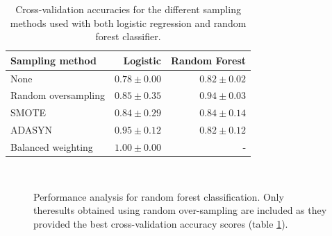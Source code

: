 \begin{table}[h]
    \centering
    \caption{Cross-validation accuracies for the different sampling methods
                used with both logistic regression and random forest
                classifier.}
    \label{tab:crossvals}
    \begin{tabular}{l|r|r}
        Sampling method & Logistic & Random Forest \\
        \hline
        None & $0.78 \pm 0.00$ & $0.82 \pm 0.02$ \\
        Random oversampling & $0.85 \pm 0.35$ & $0.94 \pm 0.03$ \\
        SMOTE & $0.84 \pm 0.29$ & $0.84 \pm 0.14$ \\
        ADASYN & $0.95 \pm 0.12$ & $0.82 \pm 0.12$ \\
        Balanced weighting & $1.00 \pm 0.00$ & - \\
    \end{tabular}
\end{table}

\begin{figure}[H]
\begin{center}
     \\
\end{center}
\caption[caption]{Performance analysis for random forest classification. Only theresults obtained using random over-sampling are included as they provided the
best cross-validation accuracy scores (table \ref{tab:crossvals}).}
\label{fig:forest-performance}
\end{figure}


